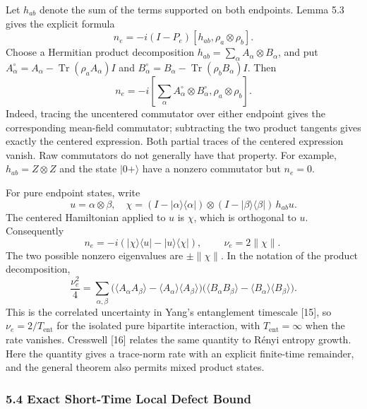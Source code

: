 \documentclass[
  11pt,
]{article}
\begin{document}
Let \(h_{ab}\) denote the sum of the terms supported on both endpoints.
Lemma 5.3 gives the explicit formula
\[
 n_e=-i(I-P_e)[h_{ab},\rho_a\otimes\rho_b].
\]
Choose a Hermitian product decomposition
\(h_{ab}=\sum_\alpha A_\alpha\otimes B_\alpha\), and put
\(A_\alpha^\circ=A_\alpha-\operatorname{Tr}(\rho_aA_\alpha)I\) and
\(B_\alpha^\circ=B_\alpha-\operatorname{Tr}(\rho_bB_\alpha)I\). Then
\[
 n_e=-i\left[\sum_\alpha A_\alpha^\circ\otimes B_\alpha^\circ,
                   \rho_a\otimes\rho_b\right].
\]
Indeed, tracing the uncentered commutator over either endpoint gives
the corresponding mean-field commutator; subtracting the two product
tangents gives exactly the centered expression. Both partial traces of
the centered expression vanish. Raw commutators do not generally have
that property. For example, \(h_{ab}=Z\otimes Z\) and the state
\(|0+\rangle\) have a nonzero commutator but \(n_e=0\).

For pure endpoint states, write
\[
 u=\alpha\otimes\beta,\quad
 \chi=(I-|\alpha\rangle\langle\alpha|)
       \otimes(I-|\beta\rangle\langle\beta|)\,h_{ab}u.
\]
The centered Hamiltonian applied to \(u\) is \(\chi\), which is
orthogonal to \(u\). Consequently
\[
 n_e=-i(|\chi\rangle\langle u|-|u\rangle\langle\chi|),
 \qquad
 \boxed{\ \nu_e=2\lVert \chi\rVert.\ }
\]
The two possible nonzero eigenvalues are \(\pm\lVert \chi\rVert\).
In the notation of the product decomposition,
\[
 \frac{\nu_e^2}{4}
 =\sum_{\alpha,\beta}
 \bigl(\langle A_\alpha A_\beta\rangle
       -\langle A_\alpha\rangle\langle A_\beta\rangle\bigr)
 \bigl(\langle B_\alpha B_\beta\rangle
       -\langle B_\alpha\rangle\langle B_\beta\rangle\bigr).
\]
This is the correlated uncertainty in Yang's entanglement timescale
{[}15{]}, so \(\nu_e=2/T_{\mathrm{ent}}\) for the isolated pure bipartite
interaction, with \(T_{\mathrm{ent}}=\infty\) when the rate vanishes.
Cresswell {[}16{]} relates the same quantity to Rényi entropy growth.
Here the quantity gives a trace-norm rate with an explicit finite-time
remainder, and the general theorem also permits mixed product states.

\subsubsection{5.4 Exact Short-Time Local Defect Bound}\label{exact-short-time-local-defect-bound}
\end{document}
